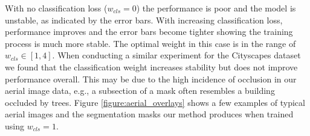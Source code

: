 \documentclass[runningheads]{llncs}
\begin{document}
With no classification loss ($w_{cls}=0$) the performance is poor and the model is unstable, as indicated by the error bars. With increasing classification loss, performance improves and the error bars become tighter showing the training process is much more stable. The optimal weight in this case is in the range of $w_{cls}\in[1,4]$.  When conducting a similar experiment for the Cityscapes dataset we found that the classification weight increases stability but does not improve performance overall.
This may be due to the high incidence of occlusion in our aerial image data, e.g., a subsection of a mask often resembles a building occluded by trees. Figure \ref{figure:aerial_overlays} shows a few examples of typical aerial images and the segmentation masks our method produces when trained using $w_{cls}=1$. 
\end{document}
